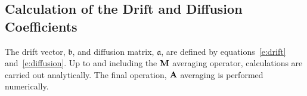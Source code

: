 

\subsection{Calculation of the Drift and Diffusion Coefficients}

The drift vector, $\mathfrak{b}$, and diffusion matrix, $\mathfrak{a}$, are defined by equations~\eqref{e:drift} and~\eqref{e:diffusion}. Up to and including the $\operatorname{\mathbf M}$ averaging operator, calculations are carried out analytically. The final operation, $\operatorname{\mathbf A}$ averaging is performed numerically.

